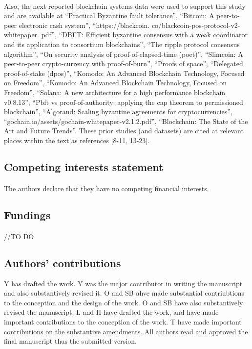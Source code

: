 \documentclass[doublespacing]{bmcart}
\begin{document}
\begin{CJK*}{UTF8}{gbsn}
\paragraph{}
	Also, the next reported blockchain systems data were used to support this study and are available at ``Practical Byzantine fault tolerance'', ``Bitcoin: A peer-to-peer electronic cash system'', ``https://blackcoin. co/blackcoin-pos-protocol-v2-whitepaper. pdf'', ``DBFT: Efficient byzantine consensus with a weak coordinator and its application to consortium blockchains'', ``The ripple protocol consensus algorithm'', ``On security analysis of proof-of-elapsed-time (poet)'', ``Slimcoin: A peer-to-peer crypto-currency with proof-of-burn'', ``Proofs of space'', ``Delegated proof-of-stake (dpos)'', ``Komodo: An Advanced Blockchain Technology, Focused on Freedom'', ``Komodo: An Advanced Blockchain Technology, Focused on Freedom'', ``Solana: A new architecture for a high
performance blockchain v0.8.13'', ``Pbft vs proof-of-authority: applying the cap theorem to permissioned blockchain'', ``Algorand: Scaling byzantine agreements for cryptocurrencies'', ``gochain.io/assets/gochain-whitepaper-v2.1.2.pdf'', ``Blockchain: The State of the Art and Future Trends''. These prior studies (and datasets) are cited at relevant places within the text as references [8-11, 13-23].

\subsection*{\centering Competing interests statement}

\paragraph{}
The authors declare that they have no competing financial interests.

\subsection*{\centering Fundings}

\paragraph{}
//TO DO

\subsection*{\centering Authors' contributions}
Y has drafted the work. Y was the major contributor in writing the manuscript and also substantively revised it. O and SB ahve made substantial contriubtions to the conception and the design of the work. O and SB have also substantively revised the manuscript. L and H have drafted the work, and have made important contributions to the conception of the work. T have made important contributions on the substantive amendments. All authors read and approved the final manuscript thus the submitted version.


\end{CJK*}
\end{document}
